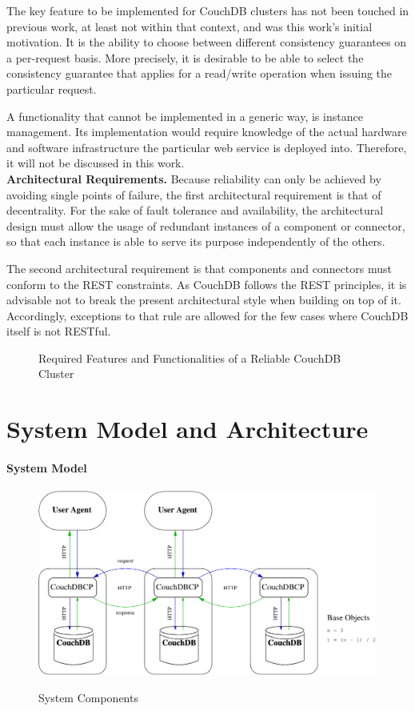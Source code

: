 The key feature to be implemented for CouchDB clusters has not been touched in previous work, at least not within that context, and was this work's initial motivation. It is the ability to choose between different consistency guarantees on a per-request basis. More precisely, it is desirable to be able to select the consistency guarantee that applies for a read/write operation when issuing the particular request.

A functionality that cannot be implemented in a generic way, is instance management. Its implementation would require knowledge of the actual hardware and software infrastructure the particular web service is deployed into. Therefore, it will not be discussed in this work.\\

\noindent
{\bf Architectural Requirements.}
Because reliability can only be achieved by avoiding single points of failure, the first architectural requirement is that of decentrality. For the sake of fault tolerance and availability, the architectural design must allow the usage of redundant instances of a component or connector, so that each instance is able to serve its purpose independently of the others.

The second architectural requirement is that components and connectors must conform to the REST constraints. As CouchDB follows the REST principles, it is advisable not to break the present architectural style when building on top of it. Accordingly, exceptions to that rule are allowed for the few cases where CouchDB itself is not RESTful.

\begin{figure}
	
	\caption{Required Features and Functionalities of a Reliable CouchDB Cluster}
	\label{mindmap_couchdb_cluster}
\end{figure}


\section{System Model and Architecture}

\paragraph{System Model}
\label{System Model}
\begin{figure}
    \centering
	{\includegraphics[width=\textwidth]{figures/system_components}}
    \caption{System Components}
    \label{system_model}
\end{figure}

